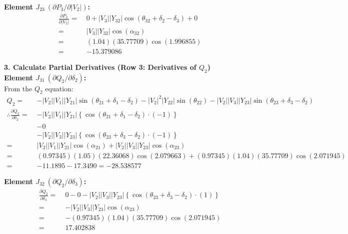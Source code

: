 \documentclass[11pt]{article}
\begin{document}
\begin{stepbox}
\vspace{0.3cm}
\noindent \textbf{Element $J_{23} \ (\partial P_3 / \partial |V_2|)$:} \\
\begin{align*}
    \frac{\partial P_3}{\partial |V_2|} =\;& 0 + |V_3||Y_{32}| \cos(\theta_{32} + \delta_2 - \delta_3) + 0 \\[0.2cm]
    =\;& |V_3||Y_{32}|\cos(\alpha_{32}) \\
    =\;& (1.04)(35.77709)\cos(1.996855) \\
    =\;& \mathbf{-15.379086}
\end{align*}

\vspace{0.5cm}
\textbf{3. Calculate Partial Derivatives (Row 3: Derivatives of $Q_2$)}\\
%
\noindent \textbf{Element $J_{31} \ (\partial Q_2 / \partial \delta_2)$:} \\
From the $Q_2$ equation:
\begin{align*}
    Q_2 =\;& -|V_2||V_1||Y_{21}| \sin(\theta_{21} + \delta_1 - \delta_2) - |V_2|^2|Y_{22}| \sin(\theta_{22}) - |V_2||V_3||Y_{23}| \sin(\theta_{23} + \delta_3 - \delta_2) \\[0.2cm]
    \therefore \frac{\partial Q_2}{\partial \delta_2} =\;& -|V_2||V_1||Y_{21}| \left\{\cos(\theta_{21} + \delta_1 - \delta_2) \cdot (-1)\right\} \\
    & - 0 \\
    & - |V_2||V_3||Y_{23}| \left\{\cos(\theta_{23} + \delta_3 - \delta_2) \cdot (-1)\right\} \\[0.2cm]
    =\;& |V_2||V_1||Y_{21}|\cos(\alpha_{21}) + |V_2||V_3||Y_{23}|\cos(\alpha_{23}) \\
    =\;& (0.97345)(1.05)(22.36068)\cos(2.079663) + (0.97345)(1.04)(35.77709)\cos(2.071945) \\
    =\;& -11.1895 - 17.3490 = \mathbf{-28.538577}
\end{align*}

\vspace{0.3cm}
\noindent \textbf{Element $J_{32} \ (\partial Q_2 / \partial \delta_3)$:} \\
\begin{align*}
    \frac{\partial Q_2}{\partial \delta_3} =\;& 0 - 0 - |V_2||V_3||Y_{23}| \left\{\cos(\theta_{23} + \delta_3 - \delta_2) \cdot (1)\right\} \\[0.2cm]
    =\;& -|V_2||V_3||Y_{23}|\cos(\alpha_{23}) \\
    =\;& -(0.97345)(1.04)(35.77709)\cos(2.071945) \\
    =\;& \mathbf{17.402838}
\end{align*}


\end{stepbox}
\end{document}
